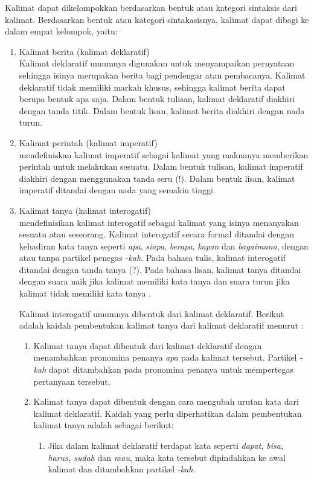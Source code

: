 Kalimat dapat dikelompokkan berdasarkan bentuk atau kategori sintaksis dari kalimat. Berdasarkan bentuk atau kategori sintakasisnya, kalimat dapat dibagi ke dalam empat kelompok, yaitu:
\begin{enumerate}
	\item Kalimat berita (kalimat deklaratif)\\
	Kalimat deklaratif umumnya digunakan untuk menyampaikan pernyataan sehingga isinya merupakan berita bagi pendengar atau pembacanya. Kalimat deklaratif tidak memiliki markah khusus, sehingga kalimat berita dapat berupa bentuk apa saja. Dalam bentuk tulisan, kalimat deklaratif diakhiri dengan tanda titik. Dalam bentuk lisan, kalimat berita diakhiri dengan nada turun.

	\item Kalimat perintah (kalimat imperatif)\\
	\citet{dardjo_et_al} mendefiniskan kalimat imperatif sebagai kalimat yang maknanya memberikan perintah untuk melakukan sesuatu. Dalam bentuk tulisan, kalimat imperatif diakhiri dengan menggunakan tanda seru (!). Dalam bentuk lisan, kalimat imperatif ditandai dengan nada yang semakin tinggi.

	\item Kalimat tanya (kalimat interogatif)\\
	\citet{dardjo_et_al} mendefinisikan kalimat interogatif sebagai kalimat yang isinya menanyakan sesuatu atau seseorang. Kalimat interogatif secara formal ditandai dengan kehadiran kata tanya seperti \emph{apa}, \emph{siapa}, \emph{berapa}, \emph{kapan} dan \emph{bagaimana}, dengan atau tanpa partikel penegas \emph{-kah}. Pada bahasa tulis, kalimat interogatif ditandai dengan tanda tanya (?). Pada bahasa lisan, kalimat tanya ditandai dengan suara naik jika kalimat memiliki kata tanya dan suara turun jika kalimat tidak memiliki kata tanya \citep{alwi}.

	Kalimat interogatif umumnya dibentuk dari kalimat deklaratif. Berikut adalah kaidah pembentukan kalimat tanya dari kalimat deklaratif menurut \citet{alwi}:

	\begin{enumerate}
		\item Kalimat tanya dapat dibentuk dari kalimat deklaratif dengan menambahkan pronomina penanya \emph{apa} pada kalimat tersebut. Partikel \emph{-kah} dapat ditambahkan pada pronomina penanya untuk mempertegas pertanyaan tersebut.

		\item Kalimat tanya dapat dibentuk dengan cara mengubah urutan kata dari kalimat deklaratif. Kaidah yang perlu diperhatikan dalam pembentukan kalimat tanya adalah sebagai berikut:
		\begin{enumerate}
			\item Jika dalam kalimat deklaratif terdapat kata seperti \emph{dapat, bisa, harus, sudah} dan \emph{mau}, maka kata tersebut dipindahkan ke awal kalimat dan ditambahkan partikel \emph{-kah}.


\end{enumerate}
\end{enumerate}
\end{enumerate}
